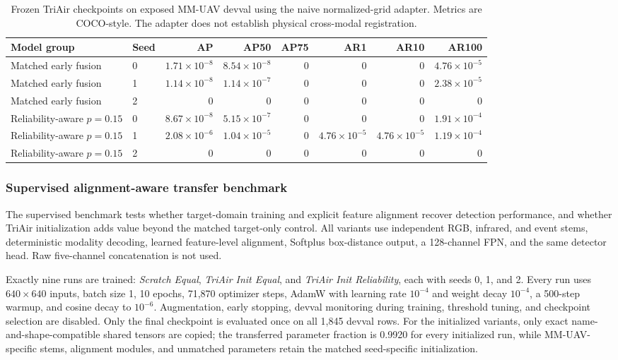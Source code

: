 \begin{table}[t]
\centering
\caption{Frozen TriAir checkpoints on exposed MM-UAV devval using the naive normalized-grid adapter. Metrics are COCO-style. The adapter does not establish physical cross-modal registration.}
\label{tab:mmuav-zero-shot}
\scriptsize
\begin{tabular}{@{}llrrrrrr@{}}
\toprule
Model group & Seed & AP & AP50 & AP75 & AR1 & AR10 & AR100\\
\midrule
Matched early fusion & 0 & $1.71{\times}10^{-8}$ & $8.54{\times}10^{-8}$ & 0 & 0 & 0 & $4.76{\times}10^{-5}$\\
Matched early fusion & 1 & $1.14{\times}10^{-8}$ & $1.14{\times}10^{-7}$ & 0 & 0 & 0 & $2.38{\times}10^{-5}$\\
Matched early fusion & 2 & 0 & 0 & 0 & 0 & 0 & 0\\
Reliability-aware $p=0.15$ & 0 & $8.67{\times}10^{-8}$ & $5.15{\times}10^{-7}$ & 0 & 0 & 0 & $1.91{\times}10^{-4}$\\
Reliability-aware $p=0.15$ & 1 & $2.08{\times}10^{-6}$ & $1.04{\times}10^{-5}$ & 0 & $4.76{\times}10^{-5}$ & $4.76{\times}10^{-5}$ & $1.19{\times}10^{-4}$\\
Reliability-aware $p=0.15$ & 2 & 0 & 0 & 0 & 0 & 0 & 0\\
\bottomrule
\end{tabular}
\end{table}

\subsubsection{Supervised alignment-aware transfer benchmark}
The supervised benchmark tests whether target-domain training and explicit feature alignment recover detection performance, and whether TriAir initialization adds value beyond the matched target-only control. All variants use independent RGB, infrared, and event stems, deterministic modality decoding, learned feature-level alignment, Softplus box-distance output, a 128-channel FPN, and the same detector head. Raw five-channel concatenation is not used.

Exactly nine runs are trained: \textit{Scratch Equal}, \textit{TriAir Init Equal}, and \textit{TriAir Init Reliability}, each with seeds 0, 1, and 2. Every run uses $640\times640$ inputs, batch size 1, 10 epochs, 71,870 optimizer steps, AdamW with learning rate $10^{-4}$ and weight decay $10^{-4}$, a 500-step warmup, and cosine decay to $10^{-6}$. Augmentation, early stopping, devval monitoring during training, threshold tuning, and checkpoint selection are disabled. Only the final checkpoint is evaluated once on all 1,845 devval rows. For the initialized variants, only exact name-and-shape-compatible shared tensors are copied; the transferred parameter fraction is 0.9920 for every initialized run, while MM-UAV-specific stems, alignment modules, and unmatched parameters retain the matched seed-specific initialization.

